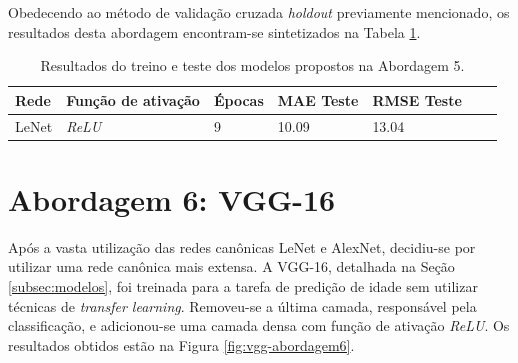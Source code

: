 	Obedecendo ao método de validação cruzada \emph{holdout} previamente mencionado, os resultados desta abordagem encontram-se sintetizados na Tabela \ref{tab:results-5}.

	\begin{table}[!ht]
		\centering
		\caption{Resultados do treino e teste dos modelos propostos na Abordagem 5.}
		\label{tab:results-5}
			\begin{tabular}{l l l l l l l}
				\toprule
				Rede & Função de ativação & Épocas & MAE Teste & RMSE Teste \\
				\midrule
				LeNet & \emph{ReLU} & 9 &  10.09 & 13.04 \\
				\bottomrule
			\end{tabular}
		\end{table}


\section{Abordagem 6: VGG-16}
	Após a vasta utilização das redes canônicas LeNet e AlexNet, decidiu-se por utilizar uma rede canônica mais extensa. A VGG-16, detalhada na Seção \ref{subsec:modelos}, foi treinada para a tarefa de predição de idade sem utilizar técnicas de \emph{transfer learning}. Removeu-se a última camada, responsável pela classificação, e adicionou-se uma camada densa com função de ativação \emph{ReLU}. Os resultados obtidos estão na Figura \ref{fig:vgg-abordagem6}.

